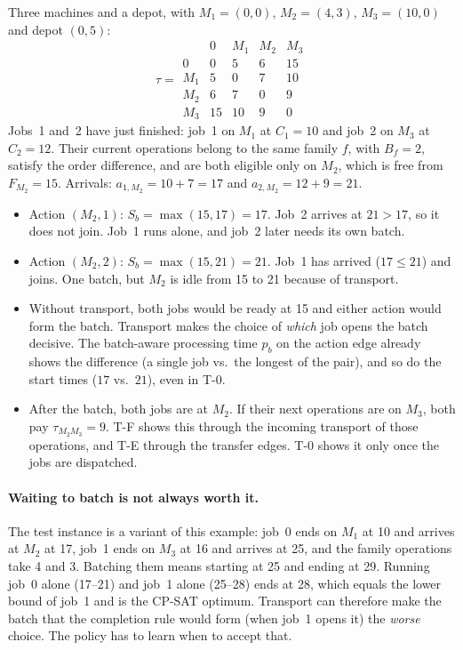 \documentclass[11pt,a4paper]{article}
\begin{document}
Three machines and a depot, with
$M_1=(0,0)$, $M_2=(4,3)$, $M_3=(10,0)$ and depot $(0,5)$:
\[
  \tau=\begin{array}{c|cccc}
     & 0 & M_1 & M_2 & M_3\\\hline
   0   & 0 & 5 & 6 & 15\\
   M_1 & 5 & 0 & 7 & 10\\
   M_2 & 6 & 7 & 0 & 9\\
   M_3 & 15& 10& 9 & 0
  \end{array}
\]
Jobs~1 and~2 have just finished: job~1 on $M_1$ at $C_1=10$ and job~2 on $M_3$
at $C_2=12$. Their current operations belong to the same family $f$, with
$B_f=2$, satisfy the order difference, and are both eligible only on $M_2$,
which is free from $F_{M_2}=15$. Arrivals: $a_{1,M_2}=10+7=17$ and
$a_{2,M_2}=12+9=21$.
\begin{itemize}
  \item Action $(M_2,1)$: $S_b=\max(15,17)=17$. Job~2 arrives at $21>17$, so it
    does not join. Job~1 runs alone, and job~2 later needs its own batch.
  \item Action $(M_2,2)$: $S_b=\max(15,21)=21$. Job~1 has arrived ($17\le21$)
    and joins. One batch, but $M_2$ is idle from 15 to 21 because of transport.
  \item Without transport, both jobs would be ready at 15 and either action would
    form the batch. Transport makes the choice of \emph{which} job opens the
    batch decisive. The batch-aware processing time $p_b$ on the action edge
    already shows the difference (a single job vs.\ the longest of the pair),
    and so do the start times ($17$ vs.\ $21$), even in T-0.
  \item After the batch, both jobs are at $M_2$. If their next operations are on
    $M_3$, both pay $\tau_{M_2M_3}=9$. T-F shows this through the incoming
    transport of those operations, and T-E through the \textsf{transfer} edges.
    T-0 shows it only once the jobs are dispatched.
\end{itemize}

\paragraph{Waiting to batch is not always worth it.} The test instance is a
variant of this example: job~0 ends on $M_1$ at 10 and arrives at $M_2$ at 17,
job~1 ends on $M_3$ at 16 and arrives at 25, and the family operations take 4
and 3. Batching them means starting at 25 and ending at 29. Running job~0 alone
(17--21) and job~1 alone (25--28) ends at 28, which equals the lower bound of
job~1 and is the CP-SAT optimum. Transport can therefore make the batch that the
completion rule would form (when job~1 opens it) the \emph{worse} choice. The
policy has to learn when to accept that.
\end{document}
